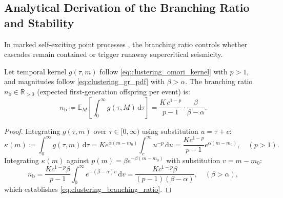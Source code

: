 \subsection{Analytical Derivation of the Branching Ratio and Stability}
\label{subsec:clustering_branching_ratio}

In marked self-exciting point processes \parencite{helmstetter2002}, the
branching ratio controls whether cascades remain contained or trigger
runaway supercritical seismicity.

\begin{theorem}
  \label{thm:clustering_branching_ratio}
  Let temporal kernel $g(\tau, m)$ follow
  \cref{eq:clustering_omori_kernel} with $p > 1$, and
  magnitudes follow \cref{eq:clustering_gr_pdf} with $\beta >
  \alpha$. The branching ratio $n_{\mathrm{b}} \in \mathbb{R}_{>0}$
  (expected first-generation offspring per event) is:
  \begin{equation}
    n_{\mathrm{b}} \coloneqq \mathbb{E}_{M}\left[ \int_0^\infty
    g(\tau, M) \, \mathrm{d}\tau \right] = \frac{K \, c^{1-p}}{p -
    1} \cdot \frac{\beta}{\beta - \alpha}.
    \label{eq:clustering_branching_ratio}
  \end{equation}
\end{theorem}

\begin{proof}
  Integrating $g(\tau, m)$ over $\tau \in [0, \infty)$ using
  substitution $u = \tau + c$:
  \begin{equation}
    \kappa(m) \coloneqq \int_0^\infty g(\tau, m) \, \mathrm{d}\tau =
    K e^{\alpha(m - m_0)} \int_c^\infty u^{-p} \, \mathrm{d}u =
    \frac{K c^{1-p}}{p - 1} e^{\alpha(m - m_0)}, \quad (p > 1).
  \end{equation}
  Integrating $\kappa(m)$ against $p(m) = \beta e^{-\beta(m - m_0)}$
  with substitution $v = m - m_0$:
  \begin{equation}
    n_{\mathrm{b}} = \frac{K c^{1-p}\beta}{p - 1}\int_0^\infty
    e^{-(\beta - \alpha)v} \, \mathrm{d}v = \frac{K c^{1-p}\beta}{(p
    - 1)(\beta - \alpha)}, \quad (\beta > \alpha),
  \end{equation}
  which establishes \cref{eq:clustering_branching_ratio}.
\end{proof}


